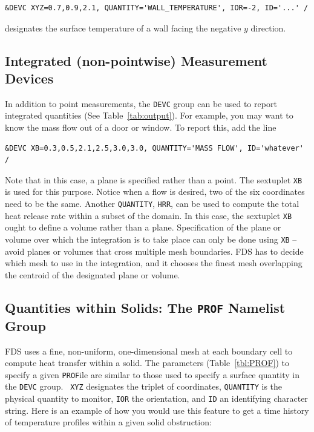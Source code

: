 \documentclass[11pt]{book}
\newcommand{\ct}{\tt\small}
\begin{document}
\footnotesize
\begin{verbatim}
&DEVC XYZ=0.7,0.9,2.1, QUANTITY='WALL_TEMPERATURE', IOR=-2, ID='...' /
\end{verbatim}
\normalsize

\noindent
designates the surface temperature of a wall facing the negative $y$
direction.



\subsection{Integrated (non-pointwise) Measurement Devices}
In addition to point measurements, the {\ct DEVC} group can be used
to report integrated quantities (See Table~\ref{tab:output}).
For example, you may want to know the mass flow out of a door or window.
To report this, add the line

\footnotesize
\begin{verbatim}
&DEVC XB=0.3,0.5,2.1,2.5,3.0,3.0, QUANTITY='MASS FLOW', ID='whatever' /
\end{verbatim}
\normalsize

\noindent
Note that in this case, a plane is specified rather than
a point. The sextuplet {\ct XB} is used for this purpose. Notice when a
flow is desired, two of the six coordinates need to be the same. Another
{\ct QUANTITY}, {\ct HRR}, can be used to compute the total heat release
rate within a subset of the domain. In this case, the sextuplet
{\ct XB} ought to define a volume rather than a plane. Specification of
the plane or volume over which the integration is to take place can only
be done using {\ct XB} -- avoid planes or volumes
that cross multiple mesh boundaries. FDS has to decide which mesh to
use in the integration, and it chooses the finest mesh overlapping
the centroid of the designated plane or volume.




\subsection{Quantities within Solids: The \texorpdfstring{{\tt PROF}}{PROF} Namelist Group}%
\label{info:PROF} 

FDS uses a fine, non-uniform, one-dimensional mesh at each boundary
cell to compute heat transfer within a solid. The parameters
(Table~\ref{tbl:PROF}) to specify a given {\ct PROF}ile are similar to
those used to specify a surface quantity in the {\ct DEVC} group. {\ct
XYZ} designates the triplet of coordinates, {\ct QUANTITY} is the
physical quantity to monitor, {\ct IOR} the orientation,
and {\ct ID} an identifying character string. Here is an example of
how you would use this feature to get a time history of temperature
profiles within a given solid obstruction:
\end{document}
